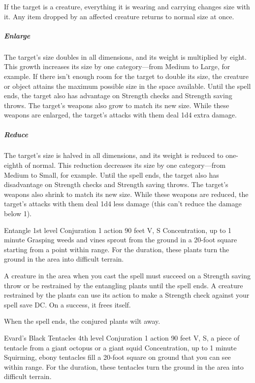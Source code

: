 \documentclass[10pt,a4paper,twoside,bg=print,twocolumn,openany,nodeprecatedcode]{dndbook}
\begin{document}
If the target is a creature, everything it is wearing and carrying changes size with it. Any item dropped by an affected creature returns to normal size at once.

\subparagraph{Enlarge}
The target's size doubles in all dimensions, and its weight is multiplied by eight. This growth increases its size by one category—from Medium to Large, for example. If there isn't enough room for the target to double its size, the creature or object attains the maximum possible size in the space available. Until the spell ends, the target also has advantage on Strength checks and Strength saving throws. The target's weapons also grow to match its new size. While these weapons are enlarged, the target's attacks with them deal 1d4 extra damage.

\subparagraph{Reduce}
The target's size is halved in all dimensions, and its weight is reduced to one-eighth of normal. This reduction decreases its size by one category—from Medium to Small, for example. Until the spell ends, the target also has disadvantage on Strength checks and Strength saving throws. The target's weapons also shrink to match its new size. While these weapons are reduced, the target's attacks with them deal 1d4 less damage (this can't reduce the damage below 1).



\DndSpellHeader%
{Entangle}
{1st level Conjuration}
{1 action}
{90 feet}
{V, S}
{Concentration, up to 1 minute}
Grasping weeds and vines sprout from the ground in a 20-foot square starting from a point within range. For the duration, these plants turn the ground in the area into difficult terrain.

A creature in the area when you cast the spell must succeed on a Strength saving throw or be restrained by the entangling plants until the spell ends. A creature restrained by the plants can use its action to make a Strength check against your spell save DC. On a success, it frees itself.

When the spell ends, the conjured plants wilt away.



\DndSpellHeader%
{Evard's Black Tentacles}
{4th level Conjuration}
{1 action}
{90 feet}
{V, S, a piece of tentacle from a giant octopus or a giant squid}
{Concentration, up to 1 minute}
Squirming, ebony tentacles fill a 20-foot square on ground that you can see within range. For the duration, these tentacles turn the ground in the area into difficult terrain.
\end{document}

